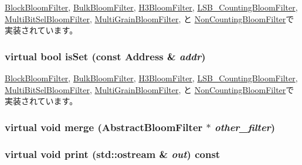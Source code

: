 \hyperlink{classBlockBloomFilter_a3e860ad851b771ac3b6eeb1716eb56bc}{BlockBloomFilter}, \hyperlink{classBulkBloomFilter_a3e860ad851b771ac3b6eeb1716eb56bc}{BulkBloomFilter}, \hyperlink{classH3BloomFilter_a3e860ad851b771ac3b6eeb1716eb56bc}{H3BloomFilter}, \hyperlink{classLSB__CountingBloomFilter_a3e860ad851b771ac3b6eeb1716eb56bc}{LSB\_\-CountingBloomFilter}, \hyperlink{classMultiBitSelBloomFilter_a3e860ad851b771ac3b6eeb1716eb56bc}{MultiBitSelBloomFilter}, \hyperlink{classMultiGrainBloomFilter_a3e860ad851b771ac3b6eeb1716eb56bc}{MultiGrainBloomFilter}, と \hyperlink{classNonCountingBloomFilter_a3e860ad851b771ac3b6eeb1716eb56bc}{NonCountingBloomFilter}で実装されています。\hypertarget{classAbstractBloomFilter_aa1b69d102655f8c5879b3df95eb205dc}{
\subsubsection[{isSet}]{\setlength{\rightskip}{0pt plus 5cm}virtual bool isSet (const {\bf Address} \& {\em addr})}}
\label{classAbstractBloomFilter_aa1b69d102655f8c5879b3df95eb205dc}


\hyperlink{classBlockBloomFilter_a4200ee289c3d941a4b209c4788f8087c}{BlockBloomFilter}, \hyperlink{classBulkBloomFilter_a4200ee289c3d941a4b209c4788f8087c}{BulkBloomFilter}, \hyperlink{classH3BloomFilter_a4200ee289c3d941a4b209c4788f8087c}{H3BloomFilter}, \hyperlink{classLSB__CountingBloomFilter_a4200ee289c3d941a4b209c4788f8087c}{LSB\_\-CountingBloomFilter}, \hyperlink{classMultiBitSelBloomFilter_a4200ee289c3d941a4b209c4788f8087c}{MultiBitSelBloomFilter}, \hyperlink{classMultiGrainBloomFilter_a4200ee289c3d941a4b209c4788f8087c}{MultiGrainBloomFilter}, と \hyperlink{classNonCountingBloomFilter_a4200ee289c3d941a4b209c4788f8087c}{NonCountingBloomFilter}で実装されています。\hypertarget{classAbstractBloomFilter_accf3024e7bc583662b4dee2e25ae484a}{
\subsubsection[{merge}]{\setlength{\rightskip}{0pt plus 5cm}virtual void merge ({\bf AbstractBloomFilter} $\ast$ {\em other\_\-filter})}}
\label{classAbstractBloomFilter_accf3024e7bc583662b4dee2e25ae484a}
\hypertarget{classAbstractBloomFilter_a3ea5f7af5db62cc24f4e40df9ea5c971}{
\subsubsection[{print}]{\setlength{\rightskip}{0pt plus 5cm}virtual void print (std::ostream \& {\em out}) const}}
\label{classAbstractBloomFilter_a3ea5f7af5db62cc24f4e40df9ea5c971}


